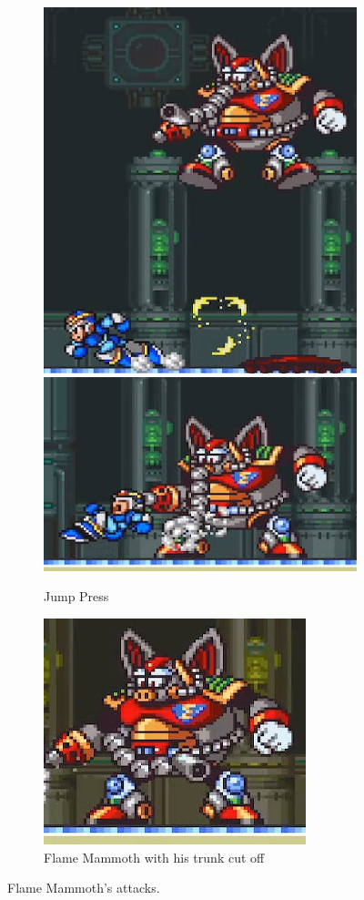 \begin{figure}
	\ContinuedFloat
	\centering
	\begin{subfigure}{\textwidth}
		\centering
		\includegraphics[width=0.3\linewidth]{figures/X1/Flame_mammoth/Mammoth_press_1.jpg}
		\includegraphics[width=0.4\linewidth]{figures/X1/Flame_mammoth/Mammoth_press_2.jpg}
		\caption{Jump Press}
	\end{subfigure}
	\begin{subfigure}{0.3\textwidth}
		\centering
		\includegraphics[width=\linewidth]{figures/X1/Flame_mammoth/Mammoth_cut.jpg}
		\caption{Flame Mammoth with his trunk cut off}
	\end{subfigure}
	\caption{Flame Mammoth's attacks.}
\end{figure}
